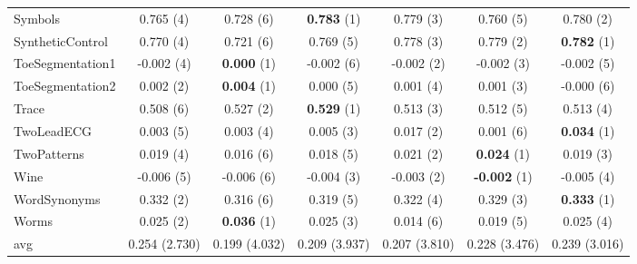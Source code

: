 \begin{table}[ht]
\begin{adjustbox}{width=\textwidth}
\begin{tabular}{lcccccc}
    Symbols & 0.765 (4) & 0.728 (6) & \textbf{0.783} (1) & 0.779 (3) & 0.760 (5) & 0.780 (2) \\
    SyntheticControl & 0.770 (4) & 0.721 (6) & 0.769 (5) & 0.778 (3) & 0.779 (2) & \textbf{0.782} (1) \\
    ToeSegmentation1 & -0.002 (4) & \textbf{0.000} (1) & -0.002 (6) & -0.002 (2) & -0.002 (3) & -0.002 (5) \\
    ToeSegmentation2 & 0.002 (2) & \textbf{0.004} (1) & 0.000 (5) & 0.001 (4) & 0.001 (3) & -0.000 (6) \\
    Trace & 0.508 (6) & 0.527 (2) & \textbf{0.529} (1) & 0.513 (3) & 0.512 (5) & 0.513 (4) \\
    TwoLeadECG & 0.003 (5) & 0.003 (4) & 0.005 (3) & 0.017 (2) & 0.001 (6) & \textbf{0.034} (1) \\
    TwoPatterns & 0.019 (4) & 0.016 (6) & 0.018 (5) & 0.021 (2) & \textbf{0.024} (1) & 0.019 (3) \\
    Wine & -0.006 (5) & -0.006 (6) & -0.004 (3) & -0.003 (2) & \textbf{-0.002} (1) & -0.005 (4) \\
    WordSynonyms & 0.332 (2) & 0.316 (6) & 0.319 (5) & 0.322 (4) & 0.329 (3) & \textbf{0.333} (1) \\
    Worms & 0.025 (2) & \textbf{0.036} (1) & 0.025 (3) & 0.014 (6) & 0.019 (5) & 0.025 (4) \\
    \hline 
    avg & 0.254 (2.730) & 0.199 (4.032) & 0.209 (3.937) & 0.207 (3.810) & 0.228 (3.476) & 0.239 (3.016) \\ 
    \hline
    \end{tabular}
    \end{adjustbox}
    \end{table}
    
    
    
